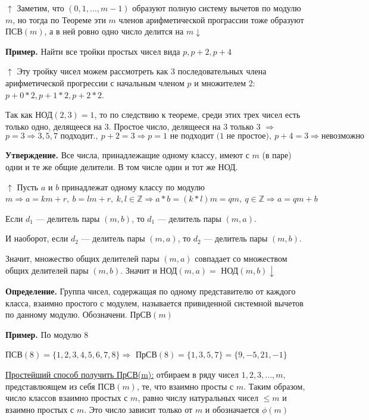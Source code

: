 \documentclass{article}
\begin{document}
            $\uparrow$ Заметим, что $(0,1,...,m - 1)$ образуют полную систему вычетов по модулю $m$, но тогда по Теореме эти $m$ членов арифметической програссии тоже образуют $\textrm{ПСВ}(m)$, а в ней ровно одно число делится на $m \downarrow$
            
            \textbf{Пример.} Найти все тройки простых чисел вида $p, p + 2, p + 4$
            
            $\uparrow$ Эту тройку чисел можем рассмотреть как 3 последовательных члена арифметической прогрессии с начальным членом $p$ и множителем 2: $p + 0*2, p + 1*2, p + 2*2$.
            
            Так как $\textrm{НОД}(2,3) = 1$, то по следствию к теореме, среди этих трех чисел есть только одно, делящееся на 3. Простое число, делящееся на 3 только 3 $\Rightarrow$
            \[ p = 3 \Rightarrow 3, 5, 7 \textrm{ подходит.},\ p + 2 = 3 \Rightarrow p = 1 \textrm{ не подходит (1 не простое)},\ p + 4 = 3 \Rightarrow \textrm{невозможно} \]
    		
            \textbf{Утверждение.} Все числа, принадлежащие одному классу, имеют с $m$ (в паре) одни и те же общие делители. В том числе один и тот же НОД.
            
            $\uparrow$ Пусть $a$ и $b$ принадлежат одному классу по модулю $m \Rightarrow a = km + r,\ b = lm + r,\ k,l \in \mathbb{Z} \Rightarrow a*b = (k*l)m = qm,\ q \in \mathbb{Z} \Rightarrow a = qm + b$  
            
            Если $d_1$ --- делитель пары $(m, b)$, то $d_1$ --- делитель пары $(m, a)$.
            
            И наоборот, если $d_2$ --- делитель пары $(m, a)$, то $d_2$ --- делитель пары $(m, b)$.
            
            Значит, множество общих делителей пары $(m, a)$ совпадает со множеством общих делителей пары $(m, b)$. Значит и НОД$(m, a) = $ НОД$(m, b) \downarrow$ 
            
            \textbf{Определение.} Группа чисел, содержащая по одному представителю от каждого класса, взаимно простого с модулем, называется привиденной системной вычетов по данному модулю. Обозначени. ПрСВ$(m)$
            
            \textbf{Пример.} По модулю 8
            
            ПСВ$(8) = \{1, 2, 3, 4, 5, 6, 7, 8\} \Rightarrow$ ПрСВ$(8) = \{1,3,5,7\} = \{9, -5, 21, -1\}$
            
            \underline{Простейший способ получить ПрСВ(m):} отбираем в ряду чисел $1,2,3,...,m$, представлюящем из себя ПСВ$(m)$, те, что взаимно просты с $m$. Таким образом, число классов взаимно простых с $m$, равно числу натуральных чисел $\leq m$ и взаимно простых с $m$. Это число зависит только от $m$ и обозначается $\phi(m)$
        
\end{document}
